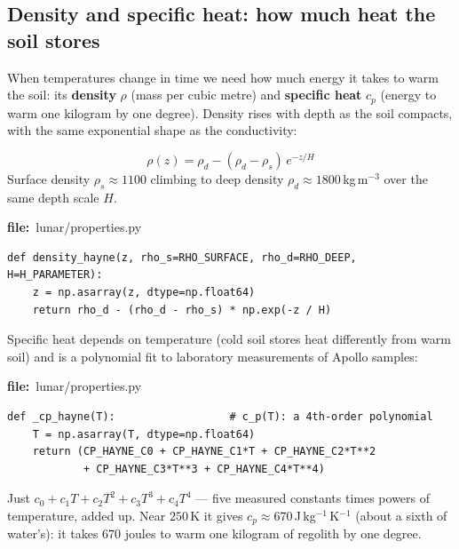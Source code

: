 \documentclass[11pt]{article}
\newcommand{\codefile}[1]{\par\smallskip\noindent
  {\footnotesize\ttfamily\color{teal!55!black}\textbf{file:}~#1}\par\nopagebreak}
\renewcommand{\codefile}[1]{\par\smallskip\noindent
    {\footnotesize\ttfamily\color{black}\textbf{file:}~#1}\par\nopagebreak}
\begin{document}
\subsection{Density and specific heat: how much heat the soil stores}
When temperatures change in time we need how much energy it takes to warm
the soil: its \textbf{density} $\rho$ (mass per cubic metre) and
\textbf{specific heat} $c_p$ (energy to warm one kilogram by one degree).
Density rises with depth as the soil compacts, with the same exponential
shape as the conductivity:
\begin{mathbox}
\[
\rho(z) = \rho_d - (\rho_d - \rho_s)\,e^{-z/H}
\]
Surface density $\rho_s\approx1100$ climbing to deep density
$\rho_d\approx1800\,$kg\,m$^{-3}$ over the same depth scale $H$.
\end{mathbox}
\codefile{lunar/properties.py}
\begin{lstlisting}
def density_hayne(z, rho_s=RHO_SURFACE, rho_d=RHO_DEEP, H=H_PARAMETER):
    z = np.asarray(z, dtype=np.float64)
    return rho_d - (rho_d - rho_s) * np.exp(-z / H)
\end{lstlisting}

Specific heat depends on temperature (cold soil stores heat differently
from warm soil) and is a polynomial fit to laboratory measurements of
Apollo samples:
\codefile{lunar/properties.py}
\begin{lstlisting}
def _cp_hayne(T):                  # c_p(T): a 4th-order polynomial
    T = np.asarray(T, dtype=np.float64)
    return (CP_HAYNE_C0 + CP_HAYNE_C1*T + CP_HAYNE_C2*T**2
            + CP_HAYNE_C3*T**3 + CP_HAYNE_C4*T**4)
\end{lstlisting}
\begin{codebox}
Just $c_0 + c_1 T + c_2 T^2 + c_3 T^3 + c_4 T^4$ --- five measured
constants times powers of temperature, added up. Near $250\,$K it gives
$c_p\approx670\,$J\,kg$^{-1}$\,K$^{-1}$ (about a sixth of water's): it
takes 670 joules to warm one kilogram of regolith by one degree.
\end{codebox}
\end{document}
